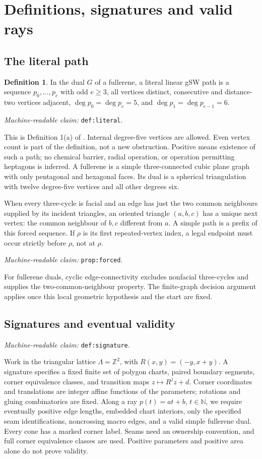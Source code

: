 \documentclass[11pt]{amsart}
\newcommand{\Z}{\mathbb Z}
\newcommand{\N}{\mathbb N}
\newcommand{\record}[1]{\nolinkurl{#1}}
\newcommand{\claimid}[1]{\par\nopagebreak\noindent\textit{Machine-readable claim:} \record{#1}.\par}
\theoremstyle{definition}\newtheorem{definition}{Definition}
\begin{document}
\section{Definitions, signatures and valid rays}\label{sec:definitions}
\subsection{The literal path}
\begin{definition}\label{def:literal}
In the dual $G$ of a fullerene, a literal linear gSW path is a sequence
$p_0,\ldots,p_e$ with odd $e\ge3$, all vertices distinct, consecutive
and distance-two vertices adjacent, $\deg p_0=\deg p_e=5$, and
$\deg p_1=\deg p_{e-1}=6$.
\end{definition}
\claimid{def:literal}
This is Definition 1(a) of \cite{BBS}. Internal degree-five vertices
are allowed. Even vertex count is part of the definition, not a new
obstruction. Positive means existence of such a path; no chemical
barrier, radial operation, or operation permitting heptagons is inferred.
A fullerene is a simple three-connected cubic plane graph with only
pentagonal and hexagonal faces. Its dual is a spherical triangulation
with twelve degree-five vertices and all other degrees six.

When every three-cycle is facial and an edge has just the two common
neighbours supplied by its incident triangles, an oriented triangle
$(a,b,c)$ has a unique next vertex: the common neighbour of $b,c$
different from $a$. A simple path is a prefix of this forced sequence.
If $\rho$ is its first repeated-vertex index, a legal endpoint must
occur strictly before $\rho$, not at $\rho$.
\label{prop:forced}\claimid{prop:forced}
For fullerene duals, cyclic edge-connectivity
\cite{Connectivity} excludes nonfacial three-cycles and supplies the
two-common-neighbour property. The finite-graph decision argument
applies once this local geometric hypothesis and the start are fixed.

\subsection{Signatures and eventual validity}\label{def:signature}
\claimid{def:signature}
Work in the triangular lattice $\Lambda=\Z^2$, with
$R(x,y)=(-y,x+y)$. A signature specifies a fixed finite set of polygon
charts, paired boundary segments, corner equivalence classes, and
transition maps $z\mapsto R^jz+d$. Corner coordinates and translations
are integer affine functions of the parameters; rotations and gluing
combinatorics are fixed. Along a ray $p(t)=at+b$, $t\in\N$, we require
eventually positive edge lengths, embedded chart interiors, only the
specified seam identifications, noncrossing macro edges, and a valid
simple fullerene dual. Every cone has a marked corner label. Seams
need an ownership convention, and full corner equivalence classes are
used. Positive parameters and positive area alone do not prove validity.
\end{document}
